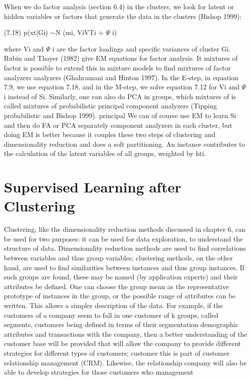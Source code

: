 When we do factor analysis (section 6.4) in the clusters, we look for latent or hidden variables or factors that generate the data in the clusters (Bishop 1999):

(7.18) p(xt|Gi) $\sim$N (mi, ViVTi + $\Psi$ i)

where Vi and $\Psi$ i are the factor loadings and specific variances of cluster Gi. Rubin and Thayer (1982) give EM equations for factor analysis. It mixtures of factor is possible to extend this in mixture models to find mixtures of factor analyzers analyzers (Ghahramani and Hinton 1997). In the E-step, in equation 7.9, we use equation 7.18, and in the M-step, we solve equation 7.12 for Vi and $\Psi$ i instead of Si. Similarly, one can also do PCA in groups, which mixtures of is called mixtures of probabilistic principal component analyzers (Tipping probabilistic and Bishop 1999). principal We can of course use EM to learn Si and then do FA or PCA separately component analyzers in each cluster, but doing EM is better because it couples these two steps of clustering and dimensionality reduction and does a soft partitioning. An instance contributes to the calculation of the latent variables of all groups, weighted by hti.

\section{Supervised Learning after Clustering}

Clustering, like the dimensionality reduction methods discussed in chapter 6, can be used for two purposes: it can be used for data exploration, to understand the structure of data. Dimensionality reduction methods are used to find correlations between variables and thus group variables; clustering methods, on the other hand, are used to find similarities between instances and thus group instances. If such groups are found, these may be named (by application experts) and their attributes be defined. One can choose the group mean as the representative prototype of instances in the group, or the possible range of attributes can be written. This allows a simpler description of the data. For example, if the customers of a company seem to fall in one customer of k groups, called segments, customers being defined in terms of their segmentation demographic attributes and transactions with the company, then a better understanding of the customer base will be provided that will allow the company to provide different strategies for different types of customers; customer this is part of customer relationship management (CRM). Likewise, the relationship company will also be able to develop strategies for those customers who management

